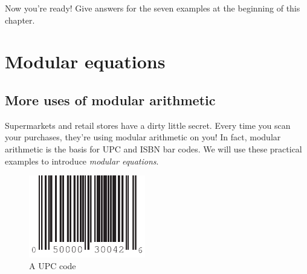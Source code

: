 \begin{exercise}{28}
Now you're ready! Give answers for the seven examples at the beginning of this chapter.
\end{exercise}

\section{Modular equations\quad
{}}\label{section:modular:ModularEquations}

\subsection{More uses of modular arithmetic  }
 
Supermarkets and retail stores have a dirty little secret. Every time you scan your purchases, they're using modular arithmetic on you! In fact, modular arithmetic is the basis for UPC and ISBN bar codes. We will use these practical examples to introduce \emph{modular equations}. 

\begin{figure}
\begin{center}
\centerline {
\includegraphics[width=2in]{images/UPCcode.pdf}
}
\end{center}
\caption{A UPC code}
\label{groups_figure_3}
\end{figure}


